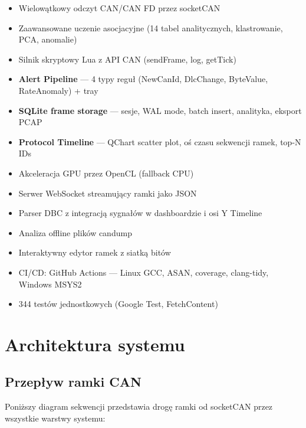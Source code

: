 \documentclass[a4paper,12pt]{article}
\begin{document}
\begin{infobox}
\begin{itemize}[nosep]
    \item Wielowątkowy odczyt CAN/CAN FD przez socketCAN
    \item Zaawansowane uczenie asocjacyjne (14 tabel analitycznych, klastrowanie, PCA, anomalie)
    \item Silnik skryptowy Lua z API CAN (sendFrame, log, getTick)
    \item \textbf{Alert Pipeline} — 4 typy reguł (NewCanId, DlcChange, ByteValue, RateAnomaly) + tray
    \item \textbf{SQLite frame storage} — sesje, WAL mode, batch insert, analityka, eksport PCAP
    \item \textbf{Protocol Timeline} — QChart scatter plot, oś czasu sekwencji ramek, top-N IDs
    \item Akceleracja GPU przez OpenCL (fallback CPU)
    \item Serwer WebSocket streamujący ramki jako JSON
    \item Parser DBC z integracją sygnałów w dashboardzie i osi Y Timeline
    \item Analiza offline plików candump
    \item Interaktywny edytor ramek z siatką bitów
    \item CI/CD: GitHub Actions — Linux GCC, ASAN, coverage, clang-tidy, Windows MSYS2
    \item 344 testów jednostkowych (Google Test, FetchContent)
\end{itemize}
\end{infobox}

\section{Architektura systemu}

\subsection{Przepływ ramki CAN}

Poniższy diagram sekwencji przedstawia drogę ramki od socketCAN przez wszystkie warstwy systemu:
\end{document}
